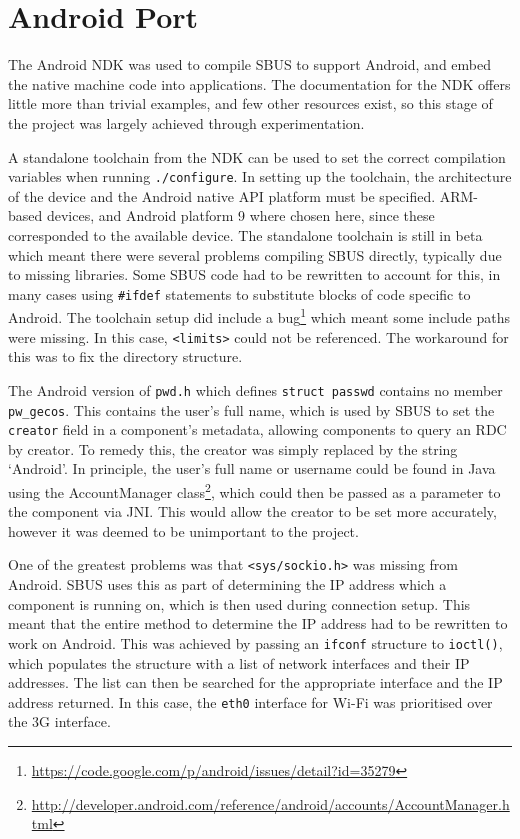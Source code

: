 \documentclass[12pt,twoside,notitlepage]{report}
\begin{document}

\section{Android Port}

The Android NDK was used to compile SBUS to support Android, and embed the native machine code into applications. 
The documentation for the NDK offers little more than trivial examples, and few other resources exist, so this stage of the project was largely achieved through experimentation. 

A standalone toolchain from the NDK can be used to set the correct compilation variables when running {\tt ./configure}. 
In setting up the toolchain, the architecture of the device and the Android native API platform must be specified. 
ARM-based devices, and Android platform 9 where chosen here, since these corresponded to the available device. 
The standalone toolchain is still in beta which meant there were several problems compiling SBUS directly, typically due to missing libraries. 
Some SBUS code had to be rewritten to account for this, in many cases using {\tt \#ifdef} statements to substitute blocks of code specific to Android. 
The toolchain setup did include a bug\footnote{\url{https://code.google.com/p/android/issues/detail?id=35279}} which meant some include paths were missing. 
In this case, {\tt <limits>} could not be referenced. 
The workaround for this was to fix the directory structure.

The Android version of {\tt pwd.h} which defines {\tt struct passwd} contains no member {\tt pw\_gecos}. 
This contains the user's full name, which is used by SBUS to set the {\tt creator} field in a component's metadata, allowing components to query an RDC by creator. 
To remedy this, the creator was simply replaced by the string `Android'. 
In principle, the user's full name or username could be found in Java using the AccountManager class\footnote{\url{http://developer.android.com/reference/android/accounts/AccountManager.html}}, which could then be passed as a parameter to the component via JNI. 
This would allow the creator to be set more accurately, however it was deemed to be unimportant to the project. 

One of the greatest problems was that {\tt <sys/sockio.h>} was missing from Android.
SBUS uses this as part of determining the IP address which a component is running on, which is then used during connection setup. 
This meant that the entire method to determine the IP address had to be rewritten to work on Android. 
This was achieved by passing an {\tt ifconf} structure to {\tt ioctl()}, which populates the structure with a list of network interfaces and their IP addresses. 
The list can then be searched for the appropriate interface and the IP address returned. 
In this case, the {\tt eth0} interface for Wi-Fi was prioritised over the 3G interface.
\end{document}
